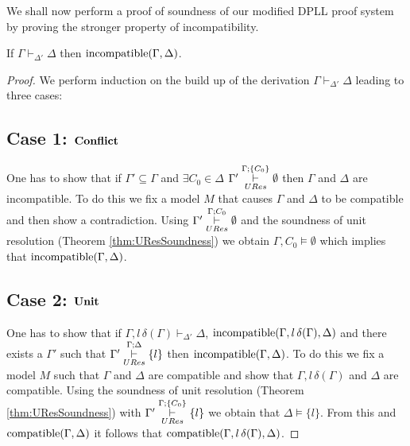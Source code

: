 %
We shall now perform a proof of soundness of our modified DPLL proof system by proving the stronger property of incompatibility. \\ \medskip
%
\begin{mytheorem}
If  $\Gamma \vdash_{\Delta'} \Delta$  then $\mathrm{incompatible}(\Gamma,\Delta)$.
\begin{proof}
We perform induction on the build up of the derivation $\Gamma \vdash_{\Delta'} \Delta$ leading to three cases:
%
\subsection*{Case 1: $\mathbf{Conflict}$}
One has to show that if $\Gamma' \subseteq \Gamma$ and $\exists C_0 \in \Delta$ $\Gamma' \overset{\Gamma;\{ C_0 \}}{\underset{URes}{\vdash}} \emptyset$ then $\Gamma$ and $\Delta$ are incompatible. To do this we fix a model $M$ that causes $\Gamma$ and $\Delta$ to be compatible and then show a contradiction. Using $\Gamma' \overset{\Gamma;C_0}{\underset{URes}{\vdash}} \emptyset$ and the soundness of unit resolution (Theorem \ref{thm:UResSoundness}) we obtain $\Gamma, C_0 \models \emptyset$ which implies that $\mathrm{incompatible}(\Gamma,\Delta)$. 
%
\subsection*{Case 2: $\mathbf{Unit}$}
One has to show that if $\Gamma, l \, \delta(\Gamma) \vdash_{\Delta'} \Delta$, $\mathrm{incompatible}(\Gamma,l \, \delta(\Gamma),\Delta)$ and there exists a $\Gamma'$ such that  $\Gamma' \overset{\Gamma;\Delta}{\underset{URes}{\vdash}} \{ l \}$ then $\mathrm{incompatible}(\Gamma,\Delta)$. To do this we fix a model $M$ such that $\Gamma$ and $\Delta$ are compatible and show that $\Gamma, l \, \delta(\Gamma)$ and $\Delta$ are compatible. Using the soundness of unit resolution (Theorem \ref{thm:UResSoundness}) with $\Gamma' \overset{\Gamma;\{ C_0\}}{\underset{URes}{\vdash}} \{ l \}$ we obtain that $\Delta \models \{l\}$. From this and $\mathrm{compatible}(\Gamma,\Delta)$ it follows that $\mathrm{compatible}(\Gamma, l \, \delta(\Gamma),\Delta)$.



\end{proof}
\end{mytheorem}
